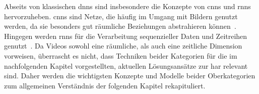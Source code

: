 





Abseits von klassischen \glspl{dnn} sind insbesondere die Konzepte von \glspl{cnn} und \glspl{rnn} hervorzuheben.
\glspl{cnn} sind Netze, die häufig im Umgang mit Bildern genutzt werden, da sie besonders gut räumliche Beziehungen abstrahieren können~\cite{Pointer19}.
Hingegen werden \glspl{rnn} für die Verarbeitung sequenzieller Daten und Zeitreihen genutzt~\cite{Pointer19}.
Da Videos sowohl eine räumliche, als auch eine zeitliche Dimension vorweisen, überrascht es nicht, dass Techniken beider Kategorien für die im nachfolgenden Kapitel vorgestellten, aktuellen Lösungsansätze zur \gls{har} relevant sind.
Daher werden die wichtigsten Konzepte und Modelle beider Oberkategorien zum allgemeinen Verständnis der folgenden Kapitel rekapituliert.

